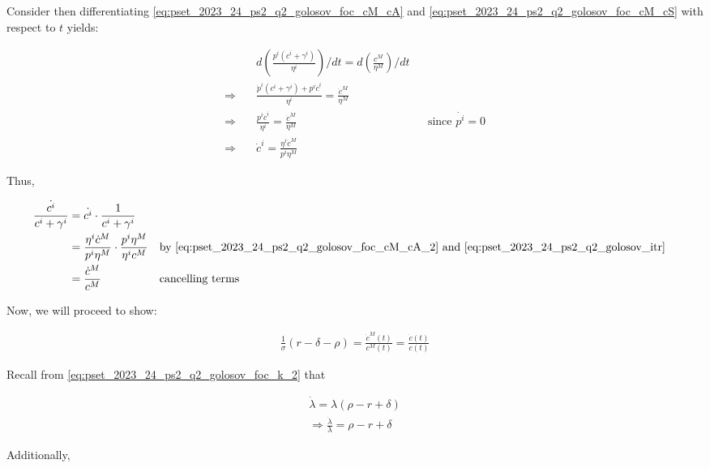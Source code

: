 Consider then differentiating \eqref{eq:pset_2023_24_ps2_q2_golosov_foc_cM_cA} and \eqref{eq:pset_2023_24_ps2_q2_golosov_foc_cM_cS}
with respect to $t$ yields:

\begin{align}
    &d\left(\frac{p^i\left(c^i+\gamma^i\right)}{\eta^i}\right) / d t  =d\left(\frac{c^M}{\eta^M}\right) / d t \\
    \Rightarrow \quad &\frac{\dot{p}^i\left(c^i+\gamma^i\right)+p^i \dot{c}^i}{\eta^i} =\frac{\dot{c}^M}{\eta^M} \\
    \Rightarrow \quad &\frac{p^i \dot{c}^i}{\eta^i} =\frac{\dot{c}^M}{\eta^M} && \text{since $\dot{p^i} = 0$} \\
    \Rightarrow \quad &\dot{c}^i  =\frac{\eta^i \dot{c}^M}{p^i \eta^M} \label{eq:pset_2023_24_ps2_q2_golosov_foc_cM_cA_2}
\end{align}

Thus,

\begin{align}
    \frac{\dot{c^i}}{c^i + \gamma^i} &= \dot{c^i} \cdot \frac{1}{c^i + \gamma^i} \\
    &= \frac{\eta^i \dot{c}^M}{p^i \eta^M} \cdot \frac{p^i \eta^M}{\eta^i c^M} && \text{by \eqref{eq:pset_2023_24_ps2_q2_golosov_foc_cM_cA_2} and \eqref{eq:pset_2023_24_ps2_q2_golosov_itr}} \\
    &= \frac{\dot{c}^M}{c^M} && \text{cancelling terms}
\end{align}

Now, we will proceed to show:

\begin{align}
    \frac{1}{\sigma}(r-\delta-\rho)=\frac{\dot{c}^M(t)}{c^M(t)}=\frac{\dot{c}(t)}{c(t)}
\end{align}

Recall from \eqref{eq:pset_2023_24_ps2_q2_golosov_foc_k_2} that 

\begin{align}
    \dot{\lambda} = \lambda(\rho - r +\delta ) \\
    \Rightarrow \frac{\dot{\lambda}}{\lambda} = \rho - r +\delta \label{eq:pset_2023_24_ps2_q2_golosov_lambda_2}
\end{align}

Additionally, 

